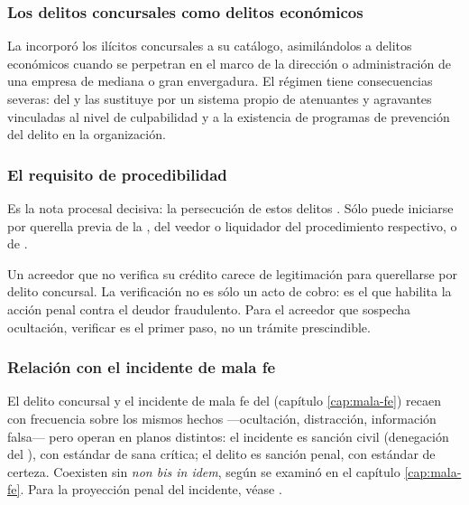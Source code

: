 
\subsubsection{Los delitos concursales como delitos económicos}

La \Ldeleco{} \citeyearpar{ley-21595} incorporó los ilícitos concursales a su catálogo,
asimilándolos a delitos económicos  cuando se perpetran en el
marco de la dirección o administración de una empresa de mediana o gran envergadura. El régimen
tiene consecuencias severas:  del
\cpen{} y las sustituye por un sistema propio de atenuantes y agravantes vinculadas al nivel de
culpabilidad y a la existencia de programas de prevención del delito en la organización.

\subsubsection{El requisito de procedibilidad}

Es la nota procesal decisiva: la persecución de estos delitos .
Sólo puede iniciarse por querella previa de la \superir{}, del veedor o liquidador del
procedimiento respectivo, o de .

\begin{foco}
Un acreedor que no verifica su crédito carece de legitimación para querellarse por delito
concursal. La verificación no es sólo un acto de cobro: es el que habilita la acción penal
contra el deudor fraudulento. Para el acreedor que sospecha ocultación, verificar es el
primer paso, no un trámite prescindible.
\end{foco}

\subsubsection{Relación con el incidente de mala fe}

El delito concursal y el incidente de mala fe del  (capítulo \ref{cap:mala-fe})
recaen con frecuencia sobre los mismos hechos ---ocultación, distracción, información falsa---
pero operan en planos distintos: el incidente es sanción civil (denegación del
\discharge{}), con estándar de sana crítica; el delito es sanción penal, con estándar de
certeza. Coexisten sin \emph{non bis in idem}, según se examinó en el capítulo
\ref{cap:mala-fe}. Para la proyección penal del incidente, véase
\textcite{doc-mala-fe-penal}.

